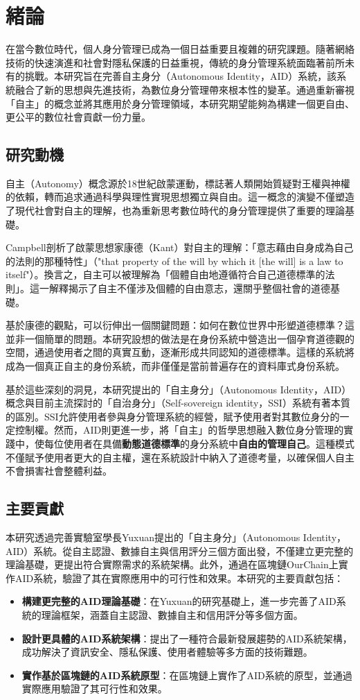 
\chapter{緒論}
在當今數位時代，個人身分管理已成為一個日益重要且複雜的研究課題。隨著網絡技術的快速演進和社會對隱私保護的日益重視，傳統的身分管理系統面臨著前所未有的挑戰。本研究旨在完善自主身分（Autonomous Identity，AID）系統，該系統融合了新的思想與先進技術，為數位身分管理帶來根本性的變革。通過重新審視「自主」的概念並將其應用於身分管理領域，本研究期望能夠為構建一個更自由、更公平的數位社會貢獻一份力量。
\section{研究動機}
自主（Autonomy）概念源於18世紀啟蒙運動，標誌著人類開始質疑對王權與神權的依賴，轉而追求通過科學與理性實現思想獨立與自由。這一概念的演變不僅塑造了現代社會對自主的理解，也為重新思考數位時代的身分管理提供了重要的理論基礎。

Campbell\cite{CAMPBELL2017381}剖析了啟蒙思想家康德（Kant）對自主的理解：「意志藉由自身成為自己的法則的那種特性」（"that property of the will by which it [the will] is a law to itself"）。換言之，自主可以被理解為「個體自由地遵循符合自己道德標準的法則」。這一解釋揭示了自主不僅涉及個體的自由意志，還關乎整個社會的道德基礎。

基於康德的觀點，可以衍伸出一個關鍵問題：如何在數位世界中形塑道德標準？這並非一個簡單的問題。本研究設想的做法是在身份系統中營造出一個孕育道德觀的空間，通過使用者之間的真實互動，逐漸形成共同認知的道德標準。這樣的系統將成為一個真正自主的身份系統，而非僅僅是當前普遍存在的資料庫式身份系統。

基於這些深刻的洞見，本研究提出的「自主身分」（Autonomous Identity，AID）概念與目前主流探討的「自治身分」（Self-sovereign identity，SSI）系統有著本質的區別。SSI允許使用者參與身分管理系統的經營，賦予使用者對其數位身分的一定控制權。然而，AID則更進一步，將「自主」的哲學思想融入數位身分管理的實踐中，使每位使用者在具備\textbf{動態道德標準}的身分系統中\textbf{自由的管理自己}。這種模式不僅賦予使用者更大的自主權，還在系統設計中納入了道德考量，以確保個人自主不會損害社會整體利益。
\section{主要貢獻}
本研究透過完善實驗室學長Yuxuan\cite{ntu-lin2014autonomous}提出的「自主身分」（Autonomous Identity，AID）系統。從自主認證、數據自主與信用評分三個方面出發，不僅建立更完整的理論基礎，更提出符合實際需求的系統架構。此外，通過在區塊鏈OurChain\cite{ourlab408_ourchain}上實作AID系統，驗證了其在實際應用中的可行性和效果。本研究的主要貢獻包括：
\begin{itemize}
  \item \textbf{構建更完整的AID理論基礎}：在Yuxuan的研究基礎上，進一步完善了AID系統的理論框架，涵蓋自主認證、數據自主和信用評分等多個方面。
  \item \textbf{設計更具體的AID系統架構}：提出了一種符合最新發展趨勢的AID系統架構，成功解決了資訊安全、隱私保護、使用者體驗等多方面的技術難題。
  \item \textbf{實作基於區塊鏈的AID系統原型}：在區塊鏈上實作了AID系統的原型，並通過實際應用驗證了其可行性和效果。
\end{itemize}
